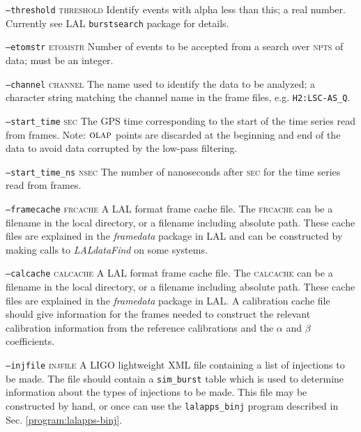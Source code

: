 \begin{entry}
\begin{entry}
\item[\texttt{--threshold} \textsc{threshold}] Identify events with alpha
less than this;
a real number.  Currently see LAL \texttt{burstsearch} package for
details.

\item[\texttt{--etomstr} \textsc{etomstr}] Number of events to be
accepted from a search over \textsc{npts} of data;  must be an
integer.

\item[\texttt{--channel} \textsc{channel}] The name used to identify the
data to be analyzed;  a character string matching
the channel name in the frame files,  e.g. \texttt{H2:LSC-AS\_Q}.

\item[\texttt{--start\_time} \textsc{sec}] The GPS time
corresponding to the start of the time series read from frames.  Note:  
$\textsc{olap}$ points are discarded at the beginning and end of the
data to avoid data corrupted by the low-pass filtering.

\item[\texttt{--start\_time\_ns} \textsc{nsec}] The number of
nanoseconds after \textsc{sec} for the time series read from frames. 

\item[\texttt{--framecache} \textsc{frcache}] A LAL format frame
cache file.    The \textsc{frcache} can be a filename in the local
directory,  or a filename including absolute path.   These cache files
are explained in the \emph{framedata} package in LAL and can be
constructed by making calls to \emph{LALdataFind} on some systems.

\item[\texttt{--calcache} \textsc{calcache}] A LAL format frame
cache file.    The \textsc{calcache} can be a filename in the local
directory,  or a filename including absolute path.   These cache files
are explained in the \emph{framedata} package in LAL.   A calibration
cache file should give information for the frames needed to construct
the relevant calibration information from the reference calibrations
and the $\alpha$ and $\beta$ coefficients.   

\item[\texttt{--injfile} \textsc{injfile}]  A LIGO lightweight XML
file containing a list of injections to be made.   The file should
contain a \verb+sim_burst+ table which is used to determine
information about the types of injections to be made.    This file may
be constructed by hand,  or once can use the \verb+lalapps_binj+
program described in Sec. \ref{program:lalapps-binj}.   


\end{entry}
\end{entry}
